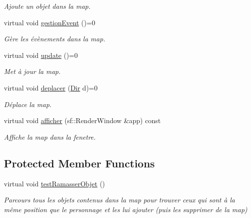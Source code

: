 \begin{DoxyCompactItemize}
\begin{DoxyCompactList}\small\item\em Ajoute un objet dans la map. \end{DoxyCompactList}\item 
\hypertarget{classMap_ac234d1a2a4019dbc386ef23c22458b06}{virtual void \hyperlink{classMap_ac234d1a2a4019dbc386ef23c22458b06}{gestion\-Event} ()=0}\label{classMap_ac234d1a2a4019dbc386ef23c22458b06}

\begin{DoxyCompactList}\small\item\em Gère les évènements dans la map. \end{DoxyCompactList}\item 
\hypertarget{classMap_a2adb80b180133a92000b46c0f7914f04}{virtual void \hyperlink{classMap_a2adb80b180133a92000b46c0f7914f04}{update} ()=0}\label{classMap_a2adb80b180133a92000b46c0f7914f04}

\begin{DoxyCompactList}\small\item\em Met à jour la map. \end{DoxyCompactList}\item 
\hypertarget{classMap_af3cf5fb88bc1fb355ed1465a8245769b}{virtual void \hyperlink{classMap_af3cf5fb88bc1fb355ed1465a8245769b}{deplacer} (\hyperlink{Espace_8h_a7cf6e8c5a5bc5e7b2afef3647870b1c4}{Dir} d)=0}\label{classMap_af3cf5fb88bc1fb355ed1465a8245769b}

\begin{DoxyCompactList}\small\item\em Déplace la map. \end{DoxyCompactList}\item 
virtual void \hyperlink{classMap_a1485990ae9a46afcf7964a600d9a5386}{afficher} (sf\-::\-Render\-Window \&app) const 
\begin{DoxyCompactList}\small\item\em Affiche la map dans la fenetre. \end{DoxyCompactList}\end{DoxyCompactItemize}
\subsection*{Protected Member Functions}
\begin{DoxyCompactItemize}
\item 
\hypertarget{classMap_a22a0a82bda61dea736d40fd58b905903}{virtual void \hyperlink{classMap_a22a0a82bda61dea736d40fd58b905903}{test\-Ramasser\-Objet} ()}\label{classMap_a22a0a82bda61dea736d40fd58b905903}

\begin{DoxyCompactList}\small\item\em Parcours tous les objets contenus dans la map pour trouver ceux qui sont à la même position que le personnage et les lui ajouter (puis les supprimer de la map) \end{DoxyCompactList}\end{DoxyCompactItemize}

